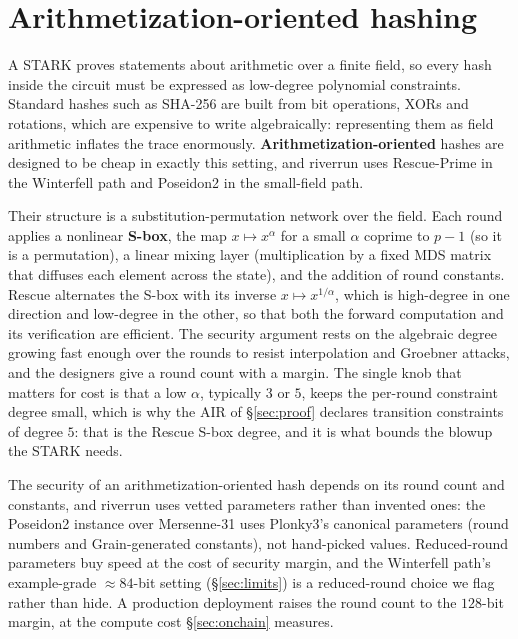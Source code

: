 \documentclass[11pt]{article}
\begin{document}
\section{Arithmetization-oriented hashing}
\label{sec:math-hash}

A STARK proves statements about arithmetic over a finite field, so every hash inside the
circuit must be expressed as low-degree polynomial constraints. Standard hashes such as
SHA-256 are built from bit operations, XORs and rotations, which are expensive to write
algebraically: representing them as field arithmetic inflates the trace enormously.
\textbf{Arithmetization-oriented} hashes are designed to be cheap in exactly this
setting, and riverrun uses Rescue-Prime \cite{rescueprime} in the Winterfell path and
Poseidon2 in the small-field path.

Their structure is a substitution-permutation network over the field. Each round applies
a nonlinear \textbf{S-box}, the map $x \mapsto x^{\alpha}$ for a small $\alpha$ coprime to
$p - 1$ (so it is a permutation), a linear mixing layer (multiplication by a fixed MDS
matrix that diffuses each element across the state), and the addition of round constants.
Rescue alternates the S-box with its inverse $x \mapsto x^{1/\alpha}$, which is
high-degree in one direction and low-degree in the other, so that both the forward
computation and its verification are efficient. The security argument rests on the
algebraic degree growing fast enough over the rounds to resist interpolation and Groebner
attacks, and the designers give a round count with a margin. The single knob that matters
for cost is that a low $\alpha$, typically $3$ or $5$, keeps the per-round constraint
degree small, which is why the AIR of \S\ref{sec:proof} declares transition constraints of
degree $5$: that is the Rescue S-box degree, and it is what bounds the blowup the STARK
needs.

\begin{honest}
The security of an arithmetization-oriented hash depends on its round count and constants,
and riverrun uses vetted parameters rather than invented ones: the Poseidon2 instance over
Mersenne-31 uses Plonky3's canonical parameters (round numbers and Grain-generated
constants), not hand-picked values. Reduced-round parameters buy speed at the cost of
security margin, and the Winterfell path's example-grade $\approx 84$-bit setting
(\S\ref{sec:limits}) is a reduced-round choice we flag rather than hide. A
production deployment raises the round count to the $128$-bit margin, at the compute cost
\S\ref{sec:onchain} measures.
\end{honest}
\end{document}
